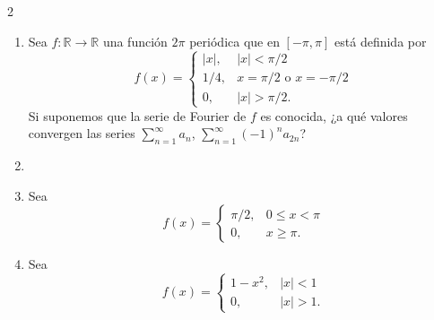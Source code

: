 \documentclass[11pt]{article}
\begin{document}
\columnseprule=0.5pt
\begin{multicols}{2}
\begin{enumerate}
\item Sea $f:\mathbb{R}\to\mathbb{R}$ una función $2\pi$ periódica que en $[-\pi,\pi]$ está definida por
\[
f(x) = \begin{cases} |x|, & |x|<\pi/2 \\ 1/4, & x=\pi/2 \text{ o } x=-\pi/2 \\ 0, & |x|>\pi/2. \end{cases}
\]
Si suponemos que la serie de Fourier de $f$ es conocida, ¿a qué valores convergen las series $\displaystyle\sum_{n=1}^{\infty} a_n$, $\displaystyle\sum_{n=1}^{\infty} (-1)^n a_{2n}$?

\item
{}

\item Sea
\[
f(x) = \begin{cases} \pi/2, & 0 \le x < \pi \\ 0, & x \ge \pi. \end{cases}
\]

\item Sea
\[
f(x) = \begin{cases} 1-x^2, & |x|<1 \\ 0, & |x|>1. \end{cases}
\]


\end{enumerate}
\end{multicols}
\end{document}
